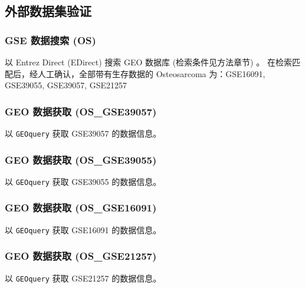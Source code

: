 \documentclass[
]{article}
\begin{document}
\hypertarget{ux5916ux90e8ux6570ux636eux96c6ux9a8cux8bc1}{%
\subsection{外部数据集验证}\label{ux5916ux90e8ux6570ux636eux96c6ux9a8cux8bc1}}

\hypertarget{gse-ux6570ux636eux641cux7d22-os}{%
\subsubsection{GSE 数据搜索 (OS)}\label{gse-ux6570ux636eux641cux7d22-os}}

以 Entrez Direct (EDirect) 搜索 GEO 数据库 (检索条件见方法章节) 。
在检索匹配后，经人工确认，全部带有生存数据的 Osteosarcoma 为：GSE16091, GSE39055, GSE39057, GSE21257

\hypertarget{geo-ux6570ux636eux83b7ux53d6-os_gse39057}{%
\subsubsection{GEO 数据获取 (OS\_GSE39057)}\label{geo-ux6570ux636eux83b7ux53d6-os_gse39057}}

以 \texttt{GEOquery} 获取 GSE39057 的数据信息。

\hypertarget{geo-ux6570ux636eux83b7ux53d6-os_gse39055}{%
\subsubsection{GEO 数据获取 (OS\_GSE39055)}\label{geo-ux6570ux636eux83b7ux53d6-os_gse39055}}

以 \texttt{GEOquery} 获取 GSE39055 的数据信息。

\hypertarget{geo-ux6570ux636eux83b7ux53d6-os_gse16091}{%
\subsubsection{GEO 数据获取 (OS\_GSE16091)}\label{geo-ux6570ux636eux83b7ux53d6-os_gse16091}}

以 \texttt{GEOquery} 获取 GSE16091 的数据信息。

\hypertarget{geo-ux6570ux636eux83b7ux53d6-os_gse21257}{%
\subsubsection{GEO 数据获取 (OS\_GSE21257)}\label{geo-ux6570ux636eux83b7ux53d6-os_gse21257}}

以 \texttt{GEOquery} 获取 GSE21257 的数据信息。
\end{document}
